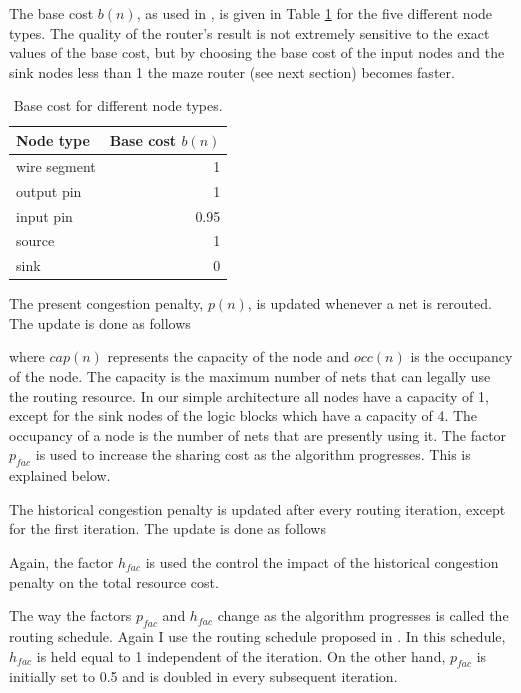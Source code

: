 \documentclass[a4paper,oneside,12pt]{article}
\begin{document}
The base cost $b(n)$, as used in \cite{betz1999aacfdf}, is given in Table \ref{tbl:baseCost} for the five different node types. The quality of the router's result is not extremely sensitive to the exact values of the base cost, but by choosing the base cost of the input nodes and the sink nodes less than 1 the maze router (see next section) becomes faster.

\begin{table}
	\caption{Base cost for different node types.}
	\label{tbl:baseCost}
	\begin{center}
		\begin{tabular}{lr}
\hline	
Node type & Base cost $b(n)$\\
\hline		
wire segment & 1 \\
output pin   & 1 \\
input pin    & 0.95 \\
source       & 1 \\
sink         & 0 \\
\hline
		\end{tabular}
	\end{center}
\end{table}

The present congestion penalty, $p(n)$, is updated whenever a net is rerouted. The update is done as follows

where $cap(n)$ represents the capacity of the node and $occ(n)$ is the occupancy of the node. The capacity is the maximum number of nets that can legally use the routing resource. In our simple architecture all nodes have a capacity of 1, except for the sink nodes of the logic blocks which have a capacity of 4. The occupancy of a node is the number of nets that are presently using it. The factor $p_{fac}$ is used to increase the sharing cost as the algorithm progresses. This is explained below.

The historical congestion penalty is updated after every routing iteration, except for the first iteration. The update is done as follows

Again, the factor $h_{fac}$ is used the control the impact of the historical congestion penalty on the total resource cost. 

The way the factors $p_{fac}$ and $h_{fac}$ change as the algorithm progresses is called the routing schedule. Again I use the routing schedule proposed in \cite{betz1999aacfdf}. In this schedule, $h_{fac}$ is held equal to 1 independent of the iteration. On the other hand, $p_{fac}$ is initially set to 0.5 and is doubled in every subsequent iteration.
\end{document}
